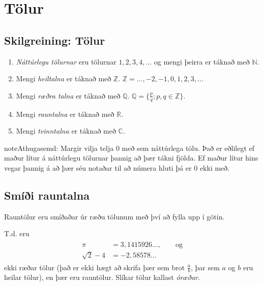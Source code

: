 \documentclass[b5paper,11pt,icelandic]{sphinxmanual}
\begin{document}
\section{Tölur}
\label{kafli01:tolur}

\subsection{Skilgreining: Tölur}
\label{kafli01:index-0}\label{kafli01:skilgreining-tolur}\begin{enumerate}
\item {} 
\textit{Náttúrlegu tölurnar} eru tölurnar \(1, 2, 3, 4, \ldots\) og
mengi þeirra er táknað með \(\mathbb{N}\).

\item {} 
Mengi \textit{heiltalna} er táknað með \(\mathbb{Z}\).
\(\mathbb{Z}= \ldots,-2,-1,0,1,2,3,\ldots\)

\item {} 
Mengi \textit{ræðra talna} er táknað með \(\mathbb{Q}\).
\(\mathbb{Q}= \{ \frac pq ; p,q \in \mathbb{Z}\}\).

\item {} 
Mengi \textit{rauntalna} er táknað með \(\mathbb{R}\).

\item {} 
Mengi \textit{tvinntalna} er táknað með \(\mathbb{C}\).

\end{enumerate}

\begin{notice}{note}{Athugasemd:}
Margir vilja telja \(0\) með sem náttúrlega tölu. Það
er eðlilegt ef maður lítur á náttúrlegu tölurnar þannig að þær tákni
fjölda. Ef maður lítur hins vegar þannig á að þær séu notaðar til að
númera hluti þá er 0 ekki með.
\end{notice}


\subsection{Smíði rauntalna}
\label{kafli01:smii-rauntalna}
Rauntölur eru smíðaðar úr ræðu tölunum með því að
fylla upp í götin.

T.d. eru
\begin{equation*}
\begin{split}\begin{aligned}
\pi &= 3,1415926\ldots, \qquad \text{og}\\
\sqrt 2 -4  &= -2,58578\ldots\end{aligned}\end{split}
\end{equation*}
ekki ræðar tölur (það er ekki hægt að skrifa þær sem brot
\(\frac ab\), þar sem \(a\) og \(b\) eru heilar tölur), en
þær eru rauntölur. Slíkar tölur kallast \textit{óræðar}.
\end{document}
